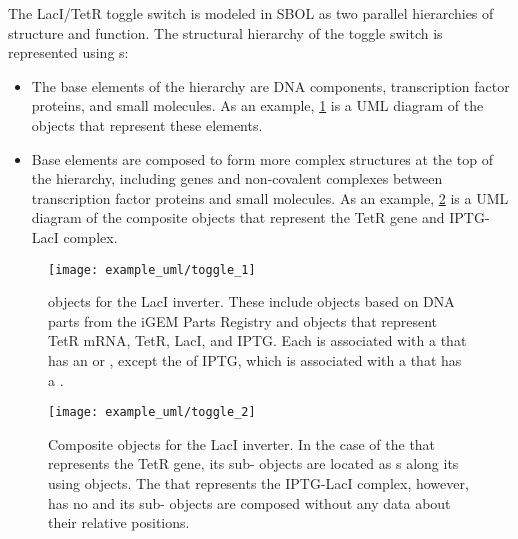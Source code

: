 The LacI/TetR toggle switch is modeled in SBOL as two parallel hierarchies of structure and function. The structural hierarchy of the toggle switch is represented using s:
\begin{itemize}
\item The base elements of the hierarchy are DNA components, transcription factor proteins, and small molecules. As an example, \ref{uml:ex_comp_defs} is a UML diagram of the  objects that represent these elements.
\item Base elements are composed to form more complex structures at the top of the hierarchy, including genes and non-covalent complexes between transcription factor proteins and small molecules. As an example, \ref{uml:ex_comp_def_compo} is a UML diagram of the composite  objects that represent the TetR gene and IPTG-LacI complex.
\end{itemize}

\begin{figure}[ht]
\begin{center}
\texttt{[image: example\_uml/toggle\_1]}
\caption[]{ objects for the LacI inverter. These include  objects based on DNA parts from the iGEM Parts Registry and   objects that represent TetR mRNA, TetR, LacI, and IPTG. Each  is associated with a  that has an  or  , except the  of IPTG, which is associated with a  that has a  .}
\label{uml:ex_comp_defs}
\end{center}
\end{figure}


\begin{figure}[ht]
\begin{center}
\texttt{[image: example\_uml/toggle\_2]}
\caption[]{Composite  objects for the LacI inverter. In the case of the  that represents the TetR gene, its sub- objects are located as s along its  using  objects. The  that represents the IPTG-LacI complex, however, has no  and its sub- objects are composed without any data about their relative positions.}
\label{uml:ex_comp_def_compo}
\end{center}
\end{figure}


